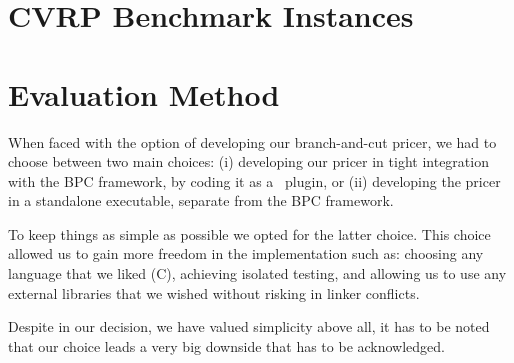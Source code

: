 \section{CVRP Benchmark Instances}
\label{sec:results-benchmark-instances}





\begin{comment}
\cite{uchoa2017}
THE CVRPLIB website
The typical instance repository of today is a web page that allows downloading the instance
files and includes additional textual information, like file format description, instance
source, best known/optimal solution values, etc. The CVRLIB web page, where the new
instances (and all the previous CVRP instances described in Section 2) are available
(http://vrp.galgos.inf.puc-rio.br/index.php/en/), is more sophisticated:
\end{comment}


\section{Evaluation Method}
\label{sec:results-evaluation-method}

When faced with the option of developing our branch-and-cut pricer,
we had to choose between two main choices:
(i) developing our pricer in tight integration with the BPC framework,
by coding it as a \bapcod\ plugin,
or (ii) developing the pricer in a standalone executable,
separate from the BPC framework.

To keep things as simple as possible we opted for the latter choice.
This choice allowed us to gain more freedom in the implementation
such as: choosing any language that we liked (C),
achieving isolated testing,
and allowing us to use any external libraries
that we wished without risking in linker conflicts.

Despite in our decision, we have valued simplicity above all,
it has to be noted that our choice leads a very big downside that has to be acknowledged.


